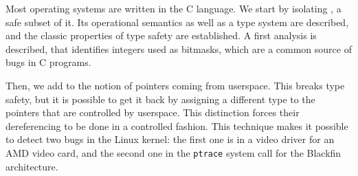 \begin{headingpage}
Most operating systems are written in the C language. We start by isolating
\langname{}, a safe subset of it. Its operational semantics as well as a type
system are described, and the classic properties of type safety are established.
A first analysis is described, that identifies integers used as bitmasks, which
are a common source of bugs in C programs.

Then, we add to \langname the notion of pointers coming from userspace. This
breaks type safety, but it is possible to get it back by assigning a different
type to the pointers that are controlled by userspace. This distinction forces
their dereferencing to be done in a controlled fashion. This technique makes it
possible to detect two bugs in the Linux kernel: the first one is in a video
driver for an AMD video card, and the second one in the \texttt{ptrace} system
call for the Blackfin architecture.





\end{headingpage}
\restoregeometry{}

